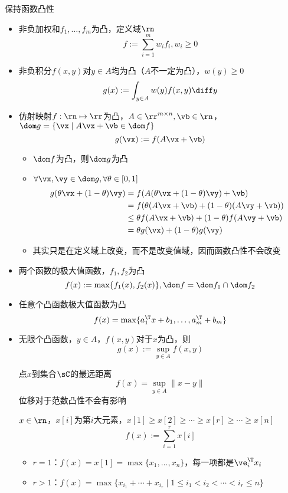 保持函数凸性
\begin{itemize}
	\item 非负加权和$f_1,\ldots,f_m$为凸，定义域$\rn$
	\[f:=\sum_{i=1}^m w_if_i,w_i\geq 0\]
	\item 非负积分$f(x,y)$对$y\in A$均为凸（$A$不一定为凸），$w(y)\geq 0$
	\[g(x):=\int_{y\in A}w(y)f(x,y)\diff y\]
	\item 仿射映射$f:\rn\mapsto\rr$为凸，$A\in\rr^{m\times n},\vb\in\rn$，$\dom g=\{\vx\mid A\vx+\vb\in\dom f\}$
	\[g(\vx):=f(A\vx+\vb)\]
	\begin{analysis}
	\begin{itemize}
		\item $\dom f$为凸，则$\dom g$为凸
		\item $\forall \vx,\vy\in\dom g,\forall\theta\in[0,1]$
		\[\begin{aligned}
		g(\theta \vx+(1-\theta)\vy)&=f(A(\theta \vx+(1-\theta)\vy)+\vb)\\
		&=f(\theta(A\vx+\vb)+(1-\theta)(A\vy+\vb))\\
		&\leq\theta f(A\vx+\vb)+(1-\theta)f(A\vy+\vb)\\
		&=\theta g(\vx)+(1-\theta)g(\vy)
		\end{aligned}\]
		\item 其实只是在定义域上改变，而不是改变值域，因而函数凸性不会改变
	\end{itemize}
	\end{analysis}
	\item 两个函数的极大值函数，$f_1,f_2$为凸
	\[f(x):=\max\{f_1(x),f_2(x)\},\dom f=\dom f_1\cap\dom f_2\]
	\item 任意个凸函数极大值函数为凸
	\[f(x)=\max\{a_1^\T x+b_1,\ldots,a_m^\T+b_m\}\]
	\item 无限个凸函数，$y\in A$，$f(x,y)$对于$x$为凸，则
	\[g(x):=\sup_{y\in A} f(x,y)\]
	\begin{example}
	点$x$到集合$\sC$的最远距离
	\[f(x)=\sup_{y\in A}\|x-y\|\]
	位移对于范数凸性不会有影响
	\end{example}
	\begin{example}
	$x\in\rn$，$x[i]$为第$i$大元素，$x[1]\geq x[2]\geq\cdots\geq x[r]\geq\cdots\geq x[n]$
	\[f(x):=\sum_{i=1}^r x[i]\]
	\begin{itemize}
	\item $r=1$：$f(x)=x[1]=\max\{x_1,\ldots,x_n\}$，每一项都是$\ve_i^\T x_i$
	\item $r>1$：$f(x)=\max\{x_{i_1}+\cdots+x_{i_r}\mid 1\leq i_1<i_2<\cdots<i_r\leq n\}$
	\end{itemize}
	\end{example}

\end{itemize}
